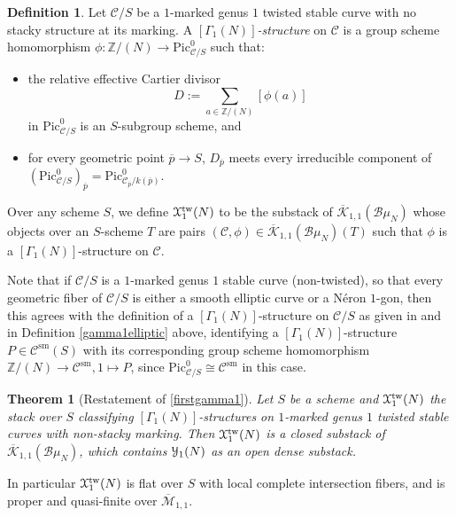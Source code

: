 \documentclass[11pt]{amsart}
\newtheorem{theorem}[subsection]{Theorem}
\theoremstyle{definition}
\newtheorem{definition}[subsection]{Definition}
\begin{document}
\begin{definition}
Let ${\mathcal{C}}/S$ be a $1$-marked genus $1$ twisted stable curve with no stacky structure at its marking. A \textit{$[\Gamma_1(N)]$-structure} on ${\mathcal{C}}$ is a group scheme homomorphism $\phi: \mathbb{Z}/(N) \rightarrow \mathrm{Pic}^0_{{\mathcal{C}}/S}$ such that:
\begin{itemize}
  \item the relative effective Cartier divisor 
  \begin{displaymath}
  D := \sum_{a \in \mathbb{Z}/(N)} [\phi(a)]
  \end{displaymath}
  in $\mathrm{Pic}^0_{{\mathcal{C}}/S}$ is an $S$-subgroup scheme, and 
  \item for every geometric point $\overline{p} \rightarrow S$, $D_{\overline{p}}$ meets every irreducible component of $(\mathrm{Pic}^0_{{\mathcal{C}}/S})_{\overline{p}} = \mathrm{Pic}^0_{{\mathcal{C}}_{\overline{p}}/k(\overline{p})}$.
\end{itemize}
Over any scheme $S$, we define ${\mathbf{\EuScript{X}}}^{\mathrm{tw}}_1(N)$ to be the substack of $\overline{\mathcal{K}}_{1,1}({\mathcal{B}} \mu_N)$ whose objects over an $S$-scheme $T$ are pairs $({\mathcal{C}},\phi) \in \overline{\mathcal{K}}_{1,1}({\mathcal{B}}\mu_N)(T)$ such that $\phi$ is a $[\Gamma_1(N)]$-structure on ${\mathcal{C}}$.
\end{definition}

Note that if ${\mathcal{C}}/S$ is a $1$-marked genus $1$ stable curve (non-twisted), so that every geometric fiber of ${\mathcal{C}}/S$ is either a smooth elliptic curve or a N\'eron $1$-gon, then this agrees with the definition of a $[\Gamma_1(N)]$-structure on ${\mathcal{C}}/S$ as given in \cite[2.4.1]{C} and in Definition \ref{gamma1elliptic} above, identifying a $[\Gamma_1(N)]$-structure $P \in {\mathcal{C}}^{\mathrm{sm}}(S)$ with its corresponding group scheme homomorphism $\mathbb{Z}/(N) \rightarrow {\mathcal{C}}^{\mathrm{sm}},1\mapsto P$, since $\mathrm{Pic}^0_{{\mathcal{C}}/S} \cong {\mathcal{C}}^\mathrm{sm}$ in this case.

\begin{theorem}[Restatement of \ref{firstgamma1}]\label{gamma1}
Let $S$ be a scheme and ${\mathbf{\EuScript{X}}}^{\mathrm{tw}}_1(N)$ the stack over $S$ classifying $[\Gamma_1(N)]$-structures on $1$-marked genus $1$ twisted stable curves with non-stacky marking. Then ${\mathbf{\EuScript{X}}}^{\mathrm{tw}}_1(N)$ is a closed substack of $\overline{\mathcal{K}}_{1,1}({\mathcal{B}} \mu_N)$, which contains ${\mathbf{\EuScript{Y}}}_1(N)$ as an open dense substack.
\end{theorem}
In particular ${\mathbf{\EuScript{X}}}^{\mathrm{tw}}_1(N)$ is flat over $S$ with local complete intersection fibers, and is proper and quasi-finite over $\overline{\mathcal{M}}_{1,1}$.
\end{document}
